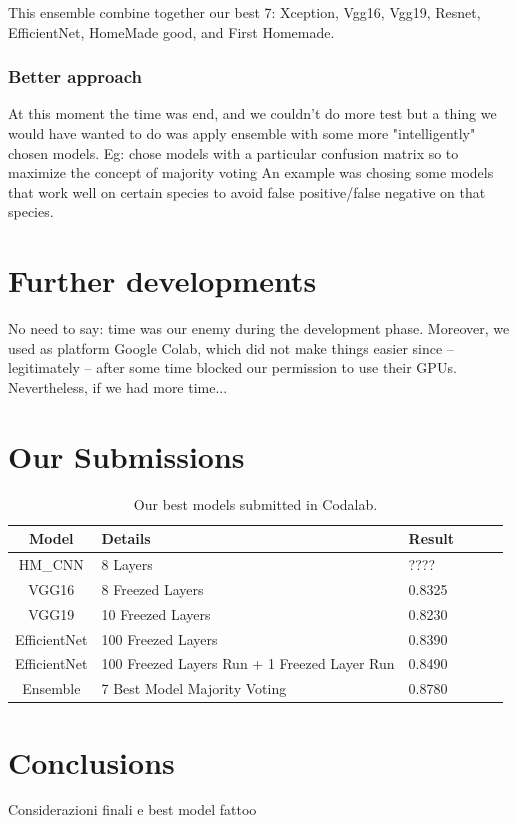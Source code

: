 \documentclass[10pt]{article}
\begin{document}
This ensemble combine together our best 7: Xception, Vgg16, Vgg19, Resnet, EfficientNet, HomeMade good, and First Homemade.

\subsubsection{Better approach}
At this moment the time was end, and we couldn't do more test but a thing we would have wanted to do was apply ensemble with some more "intelligently" chosen models.
Eg: chose models with a particular confusion matrix so to maximize the concept of majority voting
An example was chosing some models that work well on certain species to avoid false positive/false negative on that species.



\section{Further developments}
No need to say: time was our enemy during the development phase. Moreover, we used as platform Google Colab, which did not make things easier since -- legitimately -- after some time blocked our permission to use their GPUs.\\[0.1cm]
Nevertheless, if we had more time...



\section{Our Submissions}
\begin{table}[ht]
\centering
\begin{adjustbox}{width=240}
\small
\begin{tabular}{|c|l|l|l|l|l}

\hline \bf Model & \bf Details & \bf Result \\ \hline
HM_{CNN} & 8 Layers & ???? \\
VGG16   & 8 Freezed Layers & 0.8325 \\
VGG19   & 10 Freezed Layers & 0.8230 \\
EfficientNet   & 100 Freezed Layers & 0.8390 \\
EfficientNet   & 100 Freezed Layers  Run + 1 Freezed Layer Run & 0.8490 \\
Ensemble & 7 Best Model Majority Voting & 0.8780 \\
\hline
\end{tabular}
\end{adjustbox}
\caption{Our best models submitted in Codalab.}
\end{table}
\section{Conclusions}
Considerazioni finali e best model fattoo

\end{document}
